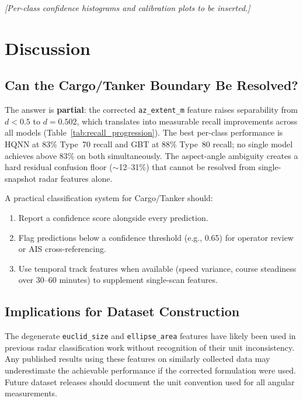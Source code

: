 \documentclass[journal]{IEEEtran}
\begin{document}
\textit{[Per-class confidence histograms and calibration plots to be inserted.]}

\section{Discussion}
\label{sec:discussion}

\subsection{Can the Cargo/Tanker Boundary Be Resolved?}

The answer is \textbf{partial}: the corrected \texttt{az\_extent\_m} feature
raises separability from $d < 0.5$ to $d = 0.502$, which translates into
measurable recall improvements across all models (Table~\ref{tab:recall_progression}).
The best per-class performance is HQNN at 83\% Type~70 recall and GBT at 88\%
Type~80 recall; no single model achieves above 83\% on both simultaneously.
The aspect-angle ambiguity creates a hard residual confusion floor
($\sim$12--31\%) that cannot be resolved from single-snapshot radar features alone.

A practical classification system for Cargo/Tanker should:
\begin{enumerate}
  \item Report a confidence score alongside every prediction.
  \item Flag predictions below a confidence threshold (e.g., 0.65) for
        operator review or AIS cross-referencing.
  \item Use temporal track features when available (speed variance, course
        steadiness over 30--60 minutes) to supplement single-scan features.
\end{enumerate}

\subsection{Implications for Dataset Construction}

The degenerate \texttt{euclid\_size} and \texttt{ellipse\_area} features have
likely been used in previous radar classification work without recognition of
their unit inconsistency. Any published results using these features on
similarly collected data may underestimate the achievable performance if the
corrected formulation were used. Future dataset releases should document
the unit convention used for all angular measurements.
\end{document}
